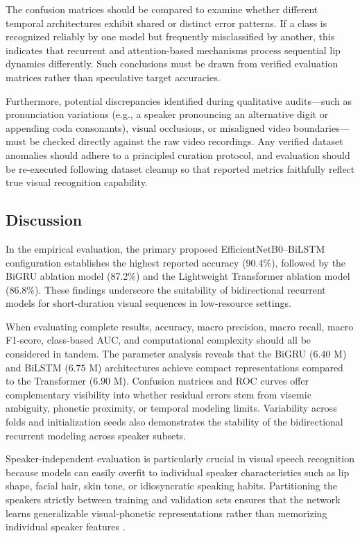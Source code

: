 \documentclass[journal]{IEEEtran}
\begin{document}
The confusion matrices should be compared to examine whether different temporal architectures exhibit shared or distinct error patterns. If a class is recognized reliably by one model but frequently misclassified by another, this indicates that recurrent and attention-based mechanisms process sequential lip dynamics differently. Such conclusions must be drawn from verified evaluation matrices rather than speculative target accuracies.

Furthermore, potential discrepancies identified during qualitative audits---such as pronunciation variations (e.g., a speaker pronouncing an alternative digit or appending coda consonants), visual occlusions, or misaligned video boundaries---must be checked directly against the raw video recordings. Any verified dataset anomalies should adhere to a principled curation protocol, and evaluation should be re-executed following dataset cleanup so that reported metrics faithfully reflect true visual recognition capability.

\subsection{Discussion}

In the empirical evaluation, the primary proposed EfficientNetB0--BiLSTM configuration establishes the highest reported accuracy (90.4\%), followed by the BiGRU ablation model (87.2\%) and the Lightweight Transformer ablation model (86.8\%). These findings underscore the suitability of bidirectional recurrent models for short-duration visual sequences in low-resource settings.

When evaluating complete results, accuracy, macro precision, macro recall, macro F1-score, class-based AUC, and computational complexity should all be considered in tandem. The parameter analysis reveals that the BiGRU ($6.40\text{ M}$) and BiLSTM ($6.75\text{ M}$) architectures achieve compact representations compared to the Transformer ($6.90\text{ M}$). Confusion matrices and ROC curves offer complementary visibility into whether residual errors stem from visemic ambiguity, phonetic proximity, or temporal modeling limits. Variability across folds and initialization seeds also demonstrates the stability of the bidirectional recurrent modeling across speaker subsets.

Speaker-independent evaluation is particularly crucial in visual speech recognition because models can easily overfit to individual speaker characteristics such as lip shape, facial hair, skin tone, or idiosyncratic speaking habits. Partitioning the speakers strictly between training and validation sets ensures that the network learns generalizable visual-phonetic representations rather than memorizing individual speaker features \cite{nemani2023speakerindependent,sheng2024visual}.
\end{document}

